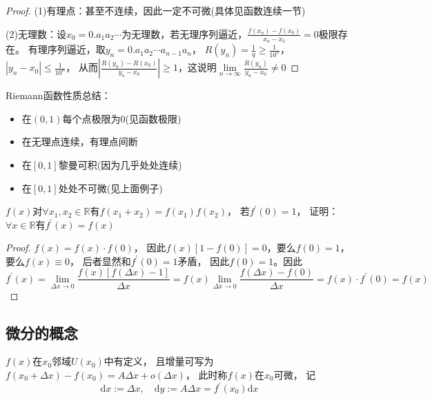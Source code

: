 \begin{proof}
  (1)有理点：甚至不连续，因此一定不可微(具体见函数连续一节)

  (2)无理数：设$x_0 = 0.a_1a_2\cdots$为无理数，若无理序列逼近，$\frac{f(x_n) - f(x_0)}{x_n - x_0} = 0$极限存在。
  有理序列逼近，取$y_n = 0.a_1a_2\cdots a_{n-1}a_n$，
  $R(y_n) = \frac{1}{q} \geq \frac{1}{10^n}$，
  $|y_n - x_0| \leq \frac{1}{10^n}$，
  从而$|\frac{R(y_n) - R(x_0)}{y_n - x_0}| \geq 1$，这说明$\lim \limits _{n \rightarrow \infty} \frac{R(y_n)}{y_n - x_0} \neq 0$
\end{proof}

\begin{note}
  Riemann函数性质总结：
  \begin{itemize}
  \item 在$(0,1)$每个点极限为$0$(见函数极限)
  \item 在无理点连续，有理点间断
  \item 在$[0,1]$黎曼可积(因为几乎处处连续)
  \item 在$[0,1]$处处不可微(见上面例子)
  \end{itemize}
\end{note}

\begin{exercise}[利用导数概念]
  $f(x)$对$\forall x_1,x_2 \in \mathbb{R}$有$f(x_1 + x_2) = f(x_1)f(x_2)$，
  若$f^{\prime}(0) = 1$，
  证明：$\forall x \in \mathbb{R}$有$f^{\prime}(x) = f(x)$
\end{exercise}

\begin{proof}
  $f(x) = f(x) \cdot f(0)$，
  因此$f(x)[1 - f(0)] = 0$，要么$f(0) = 1$，要么$f(x) \equiv 0$，
  后者显然和$f^{\prime}(0) = 1$矛盾，
  因此$f(0) = 1$。因此
  \begin{equation*}
    f^{\prime}(x) = \lim \limits _{\Delta x \rightarrow 0} \frac{f(x)[f(\Delta x )- 1]}{\Delta x} = f(x) \lim \limits _{\Delta x \rightarrow 0}\frac{f(\Delta x) - f(0)}{\Delta x} = f(x) \cdot f^{\prime}(0) = f(x)
  \end{equation*}
\end{proof}


\subsection{微分的概念}

\begin{definition}[可微]
  $f(x)$在$x_0$邻域$U(x_0)$中有定义，
  且增量可写为$f(x_0 + \Delta x) - f(x_0) = A \Delta x + o(\Delta x)$，
  此时称$f(x)$在$x_0$可微，
  记
  \begin{equation*}
    \mathrm{d} x := \Delta x,\quad \mathrm{d} y := A \Delta x = f^{\prime}(x_0) \mathrm{d} x
  \end{equation*}
\end{definition}

